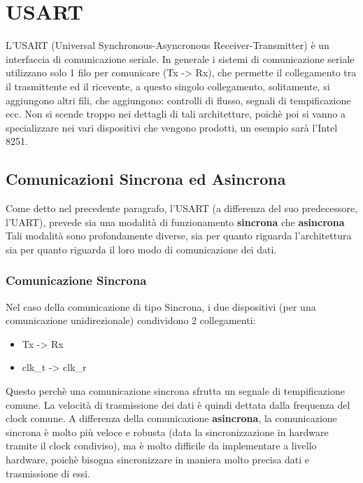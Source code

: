 \newpage
\section{USART}

L'USART (Universal Synchronous-Asyncronous Receiver-Transmitter) è un interfaccia di comunicazione seriale. In generale i sistemi di comunicazione seriale utilizzano solo 1 filo per comunicare (Tx -> Rx), che permette il collegamento tra il trasmittente ed il ricevente, a questo singolo collegamento, solitamente, si aggiungono altri fili, che aggiungono: controlli di flusso, segnali di tempificazione ecc.
Non si scende troppo nei dettagli di tali architetture, poichè poi si vanno a specializzare nei vari dispositivi che vengono prodotti, un esempio sarà l'Intel 8251.

\subsection{Comunicazioni Sincrona ed Asincrona}
Come detto nel precedente paragrafo, l'USART (a differenza del suo predecessore, l'UART), prevede sia una modalità di funzionamento \textbf{sincrona} che \textbf{asincrona}
Tali modalità sono profondamente diverse, sia per quanto riguarda l'architettura sia per quanto riguarda il loro modo di comunicazione dei dati.

\subsubsection{Comunicazione Sincrona}
Nel caso della comunicazione di tipo Sincrona, i due dispositivi (per una comunicazione unidirezionale) condividono 2 collegamenti:
\begin{itemize}
    \item Tx -> Rx
    \item clk\_t -> clk\_r
\end{itemize}

Questo perchè una comunicazione sincrona sfrutta un segnale di tempificazione comune. La velocità di trasmissione dei dati è quindi dettata dalla frequenza del clock comune. A differenza della comunicazione \textbf{asincrona}, la comunicazione sincrona è molto più veloce e robusta (data la sincronizzazione in hardware tramite il clock condiviso), ma è molto difficile da implementare a livello hardware, poichè bisogna sincronizzare in maniera molto precisa dati e trasmissione di essi.

